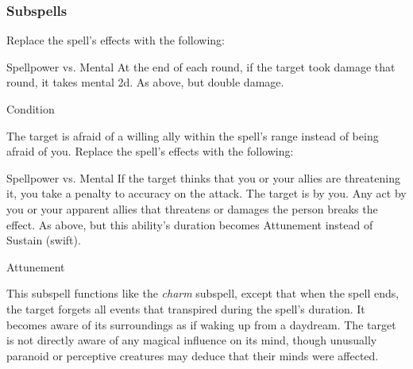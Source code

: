 \subsubsection{Subspells}
Replace the spell's effects with the following:
\begin{spellcontent}
\begin{augmenteffects}
\begin{spellattack}{Spellpower vs. Mental}
\spellsuccess At the end of each round, if the target took damage that round, it takes mental  \minus2d.
\spellcritical As above, but double damage.
\end{spellattack}
\spelldur Condition
\end{augmenteffects}
\end{spellcontent}
The target is afraid of a willing ally within the spell's range instead of being afraid of you.
Replace the spell's effects with the following:
\begin{spellcontent}
\begin{augmenteffects}
\begin{spellattack}{Spellpower vs. Mental}
\spellspecial If the target thinks that you or your allies are threatening it, you take a  penalty to accuracy on the attack.
\spellsuccess
The target is \charmed by you.
Any act by you or your apparent allies that threatens or damages the  person breaks the effect.
\spellcritical As above, but this ability's duration becomes Attunement instead of Sustain (swift).
\end{spellattack}
\spelldur Attunement
\end{augmenteffects}
\end{spellcontent}
This subspell functions like the \textit{charm} subspell, except that when the spell ends, the target forgets all events that transpired during the spell's duration.
It becomes aware of its surroundings as if waking up from a daydream.
The target is not directly aware of any magical influence on its mind, though unusually paranoid or perceptive creatures may deduce that their minds were affected.
